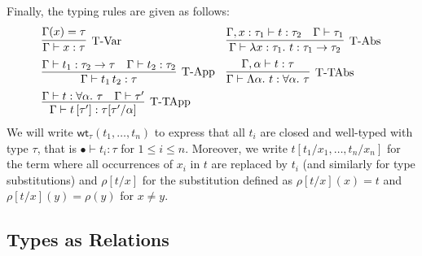 \documentclass[12pt]{article}
\theoremstyle{plain}
\theoremstyle{definition}
\newcommand{\wt}[1]{\mathsf{wt}_{#1}}
\begin{document}
Finally, the typing rules are given as follows:
\begin{align*}
&\infer[\text{T-Var}]{\Gamma \vdash x : \tau}{\Gamma(x) = \tau}&&
\infer[\text{T-Abs}]{\Gamma \vdash \lambda x : \tau_1.\ t : \tau_1 \to \tau_2}{\Gamma, x : \tau_1 \vdash t : \tau_2&\Gamma\vdash\tau_1}\\
&\infer[\text{T-App}]{\Gamma \vdash t_1\,t_2 : \tau}{\Gamma \vdash t_1 : \tau_2 \to \tau & \Gamma \vdash t_2 : \tau_2}&&
\infer[\text{T-TAbs}]{\Gamma \vdash \Lambda \alpha.\ t : \forall \alpha.\ \tau}{\Gamma, \alpha \vdash t : \tau}\\
&\infer[\text{T-TApp}]{\Gamma \vdash t\,[\tau'] : \tau[\tau'/\alpha]}{\Gamma\vdash t : \forall \alpha.\ \tau&\Gamma\vdash\tau'}
\end{align*}
We will write $\wt{\tau}(t_1,\dotsc,t_n)$ to express that all
$t_i$ are closed and well-typed with type $\tau$,
that is $\bullet \vdash t_i : \tau$ for $1\leq i\leq n$.
Moreover, we write $t[t_1/x_1,\dotsc,t_n/x_n]$
for the term where all occurrences of $x_i$ in $t$ are replaced by $t_i$ (and similarly for type substitutions)
and $\rho[t/x]$ for the substitution defined as $\rho[t/x](x)=t$ and $\rho[t/x](y)=\rho(y)$ for $x\neq y$.

\subsection{Types as Relations}\label{sec:typesasrels}
\end{document}
